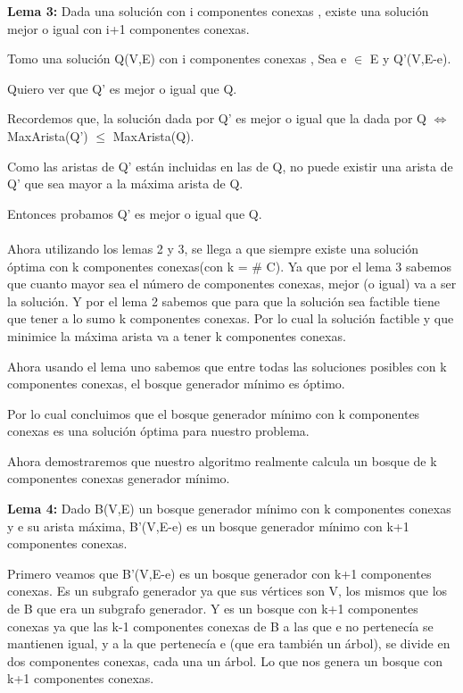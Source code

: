 \textbf{Lema 3:} Dada una solución con i componentes conexas , existe una solución mejor o igual con i+1 componentes conexas.

Tomo una solución Q(V,E) con i componentes conexas , Sea e $\in$ E y Q'(V,E-e).

Quiero ver que Q' es mejor o igual que Q.

Recordemos que, la solución dada por Q' es mejor o igual que la dada por Q $\Leftrightarrow$ MaxArista(Q') $\leq$ MaxArista(Q).

Como las aristas de Q' están incluidas en las de Q, no puede existir una arista de Q' que sea mayor a la máxima arista de Q.

Entonces probamos Q' es mejor o igual que Q. \\ \\

Ahora utilizando los lemas 2 y 3, se llega a que siempre existe una solución óptima con k componentes conexas(con k = \# C).
Ya que por el lema 3 sabemos que cuanto mayor sea el número de componentes conexas, mejor (o igual) va a ser la solución. Y por el lema 2 sabemos que para que la solución sea factible tiene que tener a lo sumo k componentes conexas. Por lo cual la solución factible y que minimice la máxima arista va a tener k componentes conexas. 

Ahora usando el lema uno sabemos que entre todas las soluciones posibles con k componentes conexas, el bosque generador mínimo es óptimo.

Por lo cual concluimos que el bosque generador mínimo con k componentes conexas es una solución óptima para nuestro problema.

Ahora demostraremos que nuestro algoritmo realmente calcula un bosque de k componentes conexas generador mínimo.

\textbf{Lema 4:} Dado B(V,E) un bosque generador mínimo con k componentes conexas y e su arista máxima, B'(V,E-e) es un bosque generador mínimo con k+1 componentes conexas.

Primero veamos que B'(V,E-e) es un bosque generador con k+1 componentes conexas. Es un subgrafo generador ya que sus vértices son V, los mismos que los de B que era un subgrafo generador. Y es un bosque con k+1 componentes conexas ya que las k-1 componentes conexas de B a las que e no pertenecía se mantienen igual, y a la que pertenecía e (que era también un árbol), se divide en dos componentes conexas, cada una un árbol. Lo que nos genera un bosque con k+1 componentes conexas.

